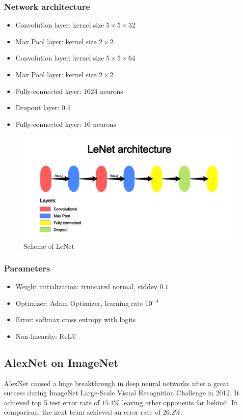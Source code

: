 \documentclass[licencjacka]{pracamgr}
\begin{document}
 		\subsubsection{Network architecture}
 			\begin{itemize}
 			\item Convolution layer: kernel size $5 \times 5 \times 32$
 			\item Max Pool layer: kernel size $2 \times 2$
 			\item Convolution layer: kernel size $5 \times 5 \times 64$
 			\item Max Pool layer: kernel size $2 \times 2$
 			\item Fully-connected layer: $1024$ neurons
 			\item Dropout layer: $0.5$
 			\item Fully-connected layer: $10$ neurons
 			\end{itemize}
 			\begin{figure}[h]
				\caption{Scheme of LeNet}
				\centering
				\includegraphics[width=\textwidth]{LeNet}
			\end{figure}
 		\subsubsection{Parameters}
 			\begin{itemize}
 			\item Weight initialization: truncated normal, stddev $0.1$
 			\item Optimizer: Adam Optimizer, learning rate $10^{-4}$
 			\item Error: softmax cross entropy with logits
 			\item Non-linearity: ReLU
 			\end{itemize}
 	\subsection{AlexNet on ImageNet}
 	AlexNet caused a huge breakthrough in deep neural networks after a great success during ImageNet Large-Scale Visual Recognition Challenge in 2012. It achieved top 5 test error rate of $15.4\%$ leaving other opponents far behind. In comparison, the next team achieved an error rate of $26.2\%$. 
\end{document}
